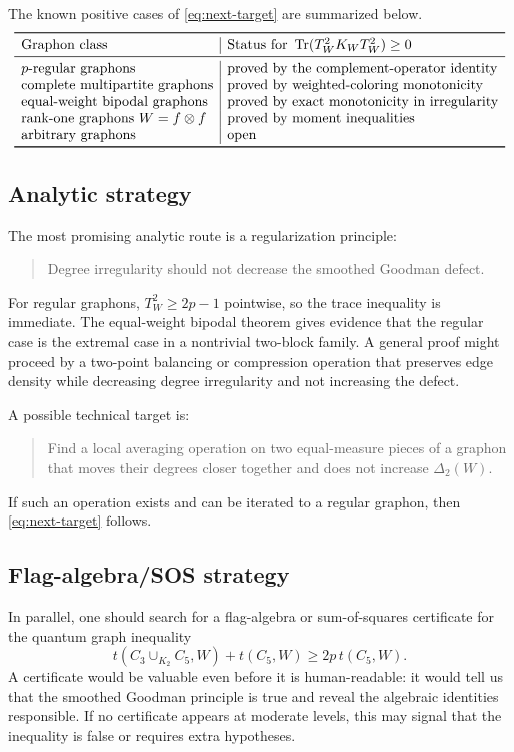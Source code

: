 \documentclass[11pt]{article}
\theoremstyle{definition}
\newcommand{\Tr}{\operatorname{Tr}}
\begin{document}
The known positive cases of \eqref{eq:next-target} are summarized below.
\[
\begin{array}{l|l}
\toprule
\text{Graphon class} & \text{Status for }\Tr(T_W^2K_WT_W^2)\ge0\\
\midrule
p\text{-regular graphons} & \text{proved by the complement-operator identity}\\
\text{complete multipartite graphons} & \text{proved by weighted-coloring monotonicity}\\
\text{equal-weight bipodal graphons} & \text{proved by exact monotonicity in irregularity}\\
\text{rank-one graphons }W=f\otimes f & \text{proved by moment inequalities}\\
\text{arbitrary graphons} & \text{open}\\
\bottomrule
\end{array}
\]

\subsection{Analytic strategy}

The most promising analytic route is a regularization principle:
\begin{quote}
Degree irregularity should not decrease the smoothed Goodman defect.
\end{quote}
For regular graphons, $T_W^2\ge2p-1$ pointwise, so the trace inequality is immediate.  The equal-weight bipodal theorem gives evidence that the regular case is the extremal case in a nontrivial two-block family.  A general proof might proceed by a two-point balancing or compression operation that preserves edge density while decreasing degree irregularity and not increasing the defect.

A possible technical target is:
\begin{quote}
Find a local averaging operation on two equal-measure pieces of a graphon that moves their degrees closer together and does not increase $\Delta_2(W)$.
\end{quote}
If such an operation exists and can be iterated to a regular graphon, then \eqref{eq:next-target} follows.

\subsection{Flag-algebra/SOS strategy}

In parallel, one should search for a flag-algebra or sum-of-squares certificate for the quantum graph inequality
\begin{equation}\label{eq:quantum-graph-SG2}
  t(C_3\cup_{K_2}C_5,W)+t(C_5,W)
  \ge 2p\,t(C_5,W).
\end{equation}
A certificate would be valuable even before it is human-readable: it would tell us that the smoothed Goodman principle is true and reveal the algebraic identities responsible.  If no certificate appears at moderate levels, this may signal that the inequality is false or requires extra hypotheses.
\end{document}
